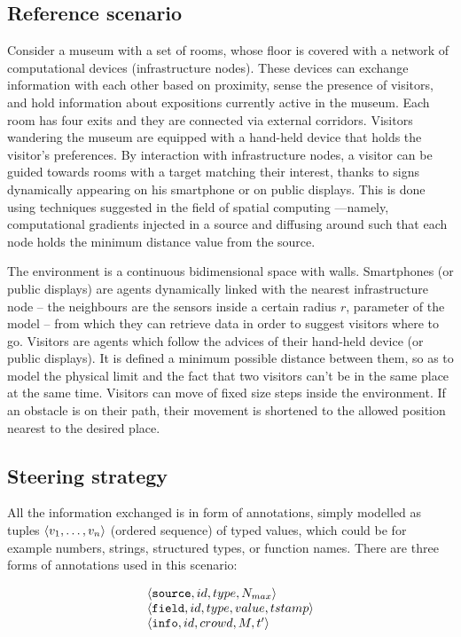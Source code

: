 \documentclass[12pt,a4paper,twoside,openright]{book}
\begin{document}
\subsection{Reference scenario}

Consider a museum with a  set of rooms, whose floor is covered with a network of computational devices (infrastructure nodes).
%
These devices can exchange information with each other based on proximity, sense the presence of visitors, and hold information about expositions currently active in the museum.
%
Each room has four exits and they are connected via external corridors. Visitors wandering the museum are equipped with a hand-held device that holds the visitor's preferences.
%
By interaction with infrastructure nodes, a visitor can be guided towards rooms with a target matching their interest, thanks to signs dynamically appearing on his smartphone or on public displays.
%
This is done using techniques suggested in the field of spatial computing \cite{VCMZ-TAAS2011}---namely, computational gradients injected in a source and diffusing around such that each node holds the minimum distance value from the source.

The environment is a continuous bidimensional space with walls. 
%
Smartphones (or public displays) are agents dynamically linked with the nearest infrastructure node -- the neighbours are the sensors inside a certain radius $r$, parameter of the model -- from which they can retrieve data in order to suggest visitors where to go. Visitors are agents which follow the advices of their hand-held device (or public displays). It is defined a minimum possible distance between them, so as to model the physical limit and the fact that two visitors can't be in the same place at the same time. Visitors can move of fixed size steps inside the environment. If an obstacle is on their path, their movement is shortened to the allowed position nearest to the desired place.

\subsection{Steering strategy}

All the information exchanged is in form of annotations, simply modelled as tuples $\langle v_1,\ldots,v_n\rangle$ (ordered sequence) of typed values, which could be for example numbers, strings, structured types, or function names.
%
\noindent There are three forms of annotations used in this scenario:

{\[\begin{array}{l}
 \langle \mathtt{source}, id, type, N_{max}\rangle \\
 \langle \mathtt{field}, id, type, value, tstamp\rangle \\
\langle \mathtt{info}, id, crowd, M, t'\rangle \\
\end{array}\]}
\end{document}
